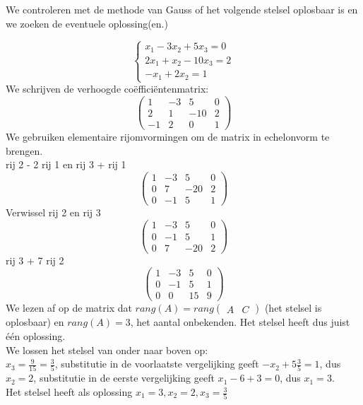 \begin{voorbeeld}
	We controleren met de methode van Gauss of het volgende stelsel oplosbaar is en we zoeken de eventuele oplossing(en.)

	\[ \left\{ 
	\begin{array}{l}
		x_1 -3x_2 +5x_3  = 0 \\
		2x_1 + x_2 -10x_3 = 2 \\
		-x_1 + 2x_2 = 1 \end{array} 
	\right. \]
	We schrijven de verhoogde co\"{e}ffici\"{e}ntenmatrix:
	\[ \left(
	\begin{array}{ccc|c}
	1 & -3 & 5 & 0 \\
	2 & 1 & -10 & 2 \\
	-1 & 2 & 0 & 1 \end{array} \right) 
	\]
	We gebruiken elementaire rijomvormingen om de matrix in echelonvorm te brengen. \\
	
	rij 2 - 2 rij 1 en rij 3 + rij 1 
	\[ \left(
	\begin{array}{ccc|c}
	1 & -3 & 5 & 0 \\
	0 & 7 & -20 & 2 \\
	0 & -1 & 5 & 1 \end{array} \right) 
	\]
	Verwissel rij 2 en rij 3
	\[ \left(
	\begin{array}{ccc|c}
	1 & -3 & 5 & 0 \\
	0 & -1 & 5 & 1 \\
	0 & 7 & -20 & 2  \end{array} \right) 
	\]
	rij 3 + 7 rij 2
	\[ \left(
	\begin{array}{ccc|c}
	1 & -3 & 5 & 0 \\
	0 & -1 & 5 & 1 \\
	0 & 0 & 15 & 9  \end{array} \right) 
	\]
	We lezen af op de matrix dat $rang(A)=rang \left( \begin{array}{c|c} A & C \end{array} \right)$ (het stelsel is oplosbaar) en $rang(A)=3$, het aantal onbekenden. Het stelsel heeft dus juist \'{e}\'{e}n oplossing.\\
	We lossen het stelsel van onder naar boven op: \\
	$x_3 =\frac{9}{15}=\frac{3}{5}$, substitutie in de voorlaatste vergelijking geeft $-x_2 + 5\frac{3}{5} = 1$, dus $x_2 =2$, substitutie in de eerste vergelijking geeft $x_1 -6+3=0$, dus $x_1 =3$.\\
	Het stelsel heeft als oplossing $x_1 =3, x_2 =2, x_3= \frac{3}{5}$\\ 
	
	\end{voorbeeld}


